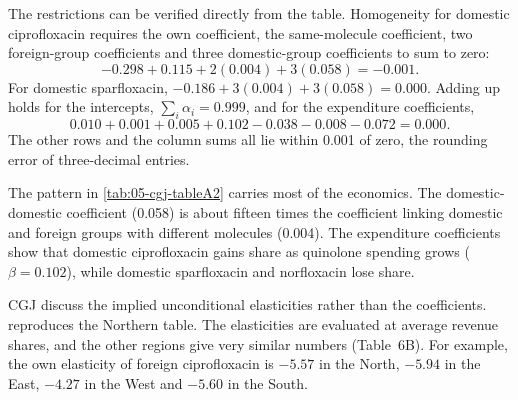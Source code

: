 The restrictions can be verified directly from the table. Homogeneity for domestic ciprofloxacin requires the own
coefficient, the same-molecule coefficient, two foreign-group coefficients and three domestic-group coefficients to sum
to zero:
\begin{equation*}
-0.298 + 0.115 + 2(0.004) + 3(0.058) = -0.001 .
\end{equation*}
For domestic sparfloxacin, $-0.186 + 3(0.004) + 3(0.058) = 0.000$. Adding up holds for the intercepts,
$\sum_i\alpha_i = 0.999$, and for the expenditure coefficients,
\begin{equation*}
0.010 + 0.001 + 0.005 + 0.102 - 0.038 - 0.008 - 0.072 = 0.000 .
\end{equation*}
The other rows and the column sums all lie within 0.001 of zero, the rounding error of three-decimal entries.

The pattern in \cref{tab:05-cgj-tableA2} carries most of the economics. The domestic-domestic coefficient (0.058) is
about fifteen times the coefficient linking domestic and foreign groups with different molecules (0.004). The
expenditure coefficients show that domestic ciprofloxacin gains share as quinolone spending grows ($\beta = 0.102$),
while domestic sparfloxacin and norfloxacin lose share.

 CGJ discuss the implied unconditional elasticities rather than the coefficients.
 reproduces the Northern table. The elasticities are evaluated at average revenue shares, and
the other regions give very similar numbers (Table~6B). For example, the own elasticity of foreign ciprofloxacin is
$-5.57$ in the North, $-5.94$ in the East, $-4.27$ in the West and $-5.60$ in the South.

